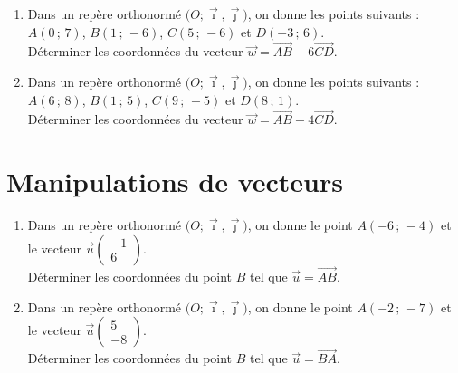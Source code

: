 \documentclass[11pt]{article}
\begin{document}
\begin{exercice}[1]

\begin{enumerate}[itemsep=1em]
\item Dans un repère orthonormé $\big(O ; \vec \imath,\vec \jmath\big)$, on donne les points suivants : $A\left(0\,;\,7\right)$, $B\left(1\,;\,-6\right)$, $C\left(5\,;\,-6\right)$ et $D\left(-3\,;\,6\right)$.\\Déterminer les coordonnées du vecteur $\overrightarrow{w}=\overrightarrow{AB}-6\overrightarrow{CD}$.
\item Dans un repère orthonormé $\big(O ; \vec \imath,\vec \jmath\big)$, on donne les points suivants : $A\left(6\,;\,8\right)$, $B\left(1\,;\,5\right)$, $C\left(9\,;\,-5\right)$ et $D\left(8\,;\,1\right)$.\\Déterminer les coordonnées du vecteur $\overrightarrow{w}=\overrightarrow{AB}-4\overrightarrow{CD}$.
\end{enumerate}
\end{exercice}

\section{Manipulations de vecteurs}

\begin{exercice}[1]

\begin{enumerate}[itemsep=1em]
\item Dans un repère orthonormé $\big(O ; \vec \imath,\vec \jmath\big)$, on donne le point $A(-6\,;\,-4)$ et le vecteur $\vec{u}\begin{pmatrix}-1\\6\end{pmatrix}$.\\Déterminer les coordonnées du point $B$ tel que $\overrightarrow{u}=\overrightarrow{AB}$.
\item Dans un repère orthonormé $\big(O ; \vec \imath,\vec \jmath\big)$, on donne le point $A(-2\,;\,-7)$ et le vecteur $\vec{u}\begin{pmatrix}5\\-8\end{pmatrix}$.\\Déterminer les coordonnées du point $B$ tel que $\overrightarrow{u}=\overrightarrow{BA}$.
\end{enumerate}
\end{exercice}
\end{document}

